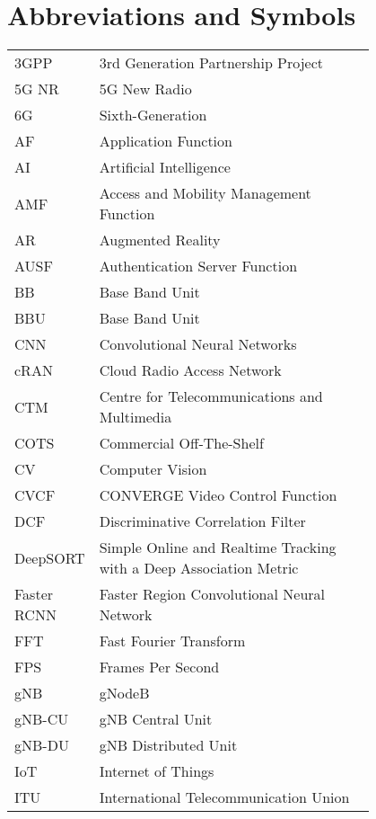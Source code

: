 \chapter*{Abbreviations and Symbols}

\begin{flushleft}
    \begin{tabular}{l p{0.8\linewidth}}
        3GPP &  3rd Generation Partnership Project \\
        5G NR &  5G New Radio \\
        6G &  Sixth-Generation \\
        AF & Application Function \\
        AI & Artificial Intelligence\\
        AMF & Access and Mobility Management Function \\
        AR & Augmented Reality\\
        AUSF & Authentication Server Function \\
        BB & Base Band Unit \\
        BBU & Base Band Unit \\
        CNN & Convolutional Neural Networks \\
        cRAN & Cloud Radio Access Network \\
        CTM & Centre for Telecommunications and Multimedia\\
        COTS & Commercial Off-The-Shelf \\
        CV & Computer Vision \\
        CVCF &  CONVERGE Video Control Function\\
        DCF & Discriminative Correlation Filter\\
        DeepSORT &  Simple Online and Realtime Tracking with a Deep Association Metric\\
        Faster RCNN & Faster Region Convolutional Neural Network \\
        FFT & Fast Fourier Transform \\
        FPS & Frames Per Second \\
        gNB & gNodeB \\
        gNB-CU & gNB Central Unit \\
        gNB-DU & gNB Distributed Unit \\
        IoT & Internet of Things \\
        ITU & International Telecommunication Union \\

\end{tabular}
\end{flushleft}
